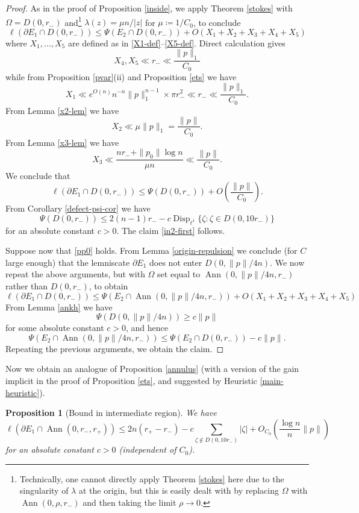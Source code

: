 \documentclass[12pt]{amsart}
\newtheorem{proposition}[theorem]{Proposition}
\newcommand{\Disp}{\operatorname{Disp}_{\ell^1}}
\newcommand{\Ann}{\operatorname{Ann}}
\begin{document}
\begin{proof} As in the proof of Proposition \ref{inside}, we apply Theorem \ref{stokes} with $\Omega = D(0,r_-)$ and\footnote{Technically, one cannot directly apply Theorem \ref{stokes} here due to the singularity of $\lambda$ at the origin, but this is easily dealt with by replacing $\Omega$ with $\Ann(0,\rho,r_-)$ and then taking the limit $\rho \to 0$.} $\lambda(z) = \mu n / |z|$ for $\mu \coloneqq 1/C_0$, to conclude
$$ \ell(\partial E_1 \cap D(0,r_-)) \leq \Psi(E_2 \cap D(0,r_-)) + O( X_1 + X_2 + X_3 + X_4 + X_5)$$
where $X_1,\dots,X_5$ are defined as in \eqref{X1-def}--\eqref{X5-def}.  Direct calculation gives
$$ X_4, X_5 \ll r_- \ll \frac{\|p\|_1}{C_0} $$
while from Proposition \ref{pvar}(ii) and Proposition \ref{ets} we have
$$ X_1 \ll e^{O(n)} n^{-n} \|p\|_1^{n-1} \times \pi r_-^2 \ll r_- \ll \frac{\|p\|_1}{C_0}.$$
From Lemma \ref{x2-lem} we have
$$ X_2 \ll \mu \|p\|_1 = \frac{\|p\|}{C_0}.$$
From Lemma \ref{x3-lem} we have
$$ X_3 \ll \frac{nr_- + \|p_0\| \log n}{\mu n} \ll \frac{\|p\|}{C_0}.$$
We conclude that
$$ \ell(\partial E_1 \cap D(0,r_-)) \leq \Psi(D(0,r_-)) + O\left(\frac{\|p\|}{C_0}\right).$$
From Corollary \ref{defect-psi-cor} we have
$$ \Psi(D(0,r_-)) \leq 2 (n-1) r_- - c \Disp \{ \zeta : \zeta \in D(0,10 r_-) \}$$
for an absolute constant $c>0$.
The claim \eqref{in2-first} follows.

Suppose now that \eqref{pp0} holds.  From Lemma \ref{origin-repulsion} we conclude (for $C$ large enough) that the lemniscate $\partial E_1$ does not enter $D(0,\|p\|/4n)$.  We now repeat the above arguments, but with $\Omega$ set equal to $\Ann(0,\|p\|/4n,r_-)$ rather than $D(0,r_-)$, to obtain
$$ \ell(\partial E_1 \cap D(0,r_-)) \leq \Psi(E_2 \cap \Ann(0,\|p\|/4n,r_-)) + O( X_1 + X_2 + X_3 + X_4 + X_5)$$
From Lemma \ref{ankh} we have
$$ \Psi(D(0, \|p\|/4n)) \geq c\| p \|$$
for some absolute constant $c>0$, and hence
$$\Psi(E_2 \cap \Ann(0,\|p\|/4n,r_-)) \leq \Psi(E_2 \cap D(0,r_-)) - c \|p\|.$$
Repeating the previous arguments, we obtain the claim.
\end{proof}

Now we obtain an analogue of Proposition \ref{annulus} (with a version of the gain implicit in the proof of Proposition \ref{ets}, and suggested by Heuristic \ref{main-heuristic}).

\begin{proposition}[Bound in intermediate region]\label{annulus-2}  We have
    $$ \ell(\partial E_1 \cap \Ann(0,r_-,r_+)) \leq 2n (r_+-r_-) - c \sum_{\zeta \notin D(0,10r_-)} |\zeta| + O_{C_0}\left(\frac{\log n}{n} \|p\| \right)$$
for an absolute constant $c>0$ (independent of $C_0$).
\end{proposition}
\end{document}
